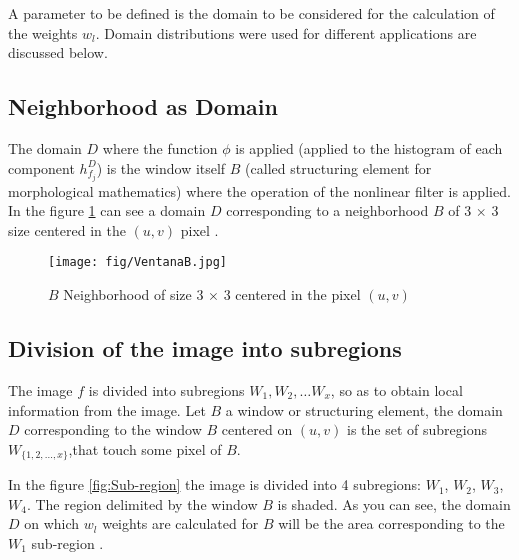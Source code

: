 A parameter to be defined is the domain to be considered for the calculation of the weights $w_l$. Domain distributions were used for different applications are discussed below.

\subsection{Neighborhood as Domain}


The domain $D$ where the function $\phi$  is applied  (applied to the histogram of each component $h_{f_j}^D$) is the window itself $B$ (called structuring element for morphological mathematics) where the operation of the nonlinear filter is applied. In the figure \ref{fig:Ventana B} can see a domain $D$ corresponding to a neighborhood $B$ of 3 $\times$ 3 size centered in the $(u,v)$ pixel .

\begin{figure}
	\centering
		\texttt{[image: fig/VentanaB.jpg]}
	\caption{$B$ Neighborhood of size 3 $\times$ 3 centered in the pixel $(u,v)$ }
	\label{fig:Ventana B}
\end{figure}

\subsection{Division of the image into subregions}

The image $f$ is divided into subregions $W_1,W_2,\dots W_{x}$, so as to obtain local information from the image.
Let $B$ a window or structuring element, the domain $D$ corresponding to the window $B$ centered on $(u,v)$ is the set of subregions $W_{\{1,2,...,x\}}$,that touch some pixel of $B$.

In the figure \ref{fig:Sub-region} the image is divided into 4 subregions: $W_1$, $W_2$, $W_3$, $W_4$.  The region delimited by the window $B$ is shaded. As you can see, the domain
$D$ on which $w_l$ weights are calculated for $B$ will be the area corresponding to the $W_1$ sub-region .
 


